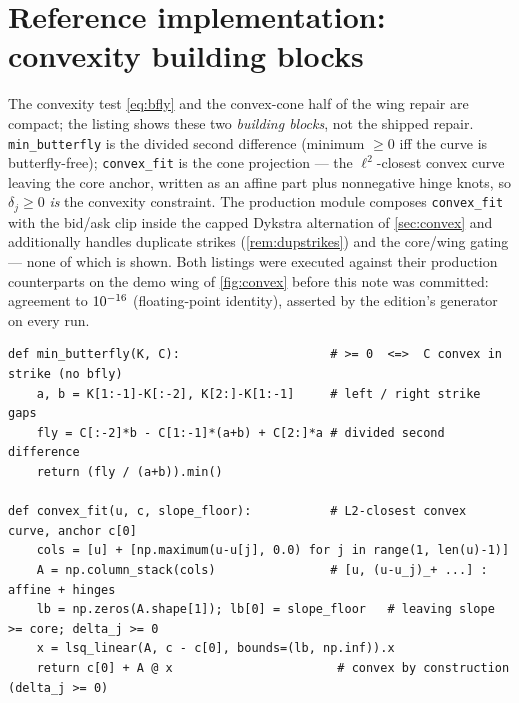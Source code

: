 \documentclass[11pt]{article}
\begin{document}
\section{Reference implementation: convexity building blocks}
\label{app:ref}

The convexity test \eqref{eq:bfly} and the convex-cone half of the wing
repair are compact; the listing shows these two \emph{building blocks},
not the shipped repair.  \texttt{min\_butterfly} is the divided second
difference (minimum $\ge0$ iff the curve is butterfly-free);
\texttt{convex\_fit} is the cone projection --- the $\ell^2$-closest
convex curve leaving the core anchor, written as an affine part plus
nonnegative hinge knots, so $\delta_j\ge0$ \emph{is} the convexity
constraint.  The production module composes \texttt{convex\_fit} with the
bid/ask clip inside the capped Dykstra alternation of \cref{sec:convex}
and additionally handles duplicate strikes (\cref{rem:dupstrikes}) and the
core/wing gating ---
none of which is shown.  Both listings were executed against their
production counterparts on the demo wing of \cref{fig:convex} before this
note was committed: agreement to $10^{-16}$ (floating-point
identity), asserted by the edition's generator on every run.

\begin{lstlisting}[caption={The no-butterfly test and the convex wing fit
(distilled from \texttt{calib/convex\_deam.py}).}]
def min_butterfly(K, C):                     # >= 0  <=>  C convex in strike (no bfly)
    a, b = K[1:-1]-K[:-2], K[2:]-K[1:-1]     # left / right strike gaps
    fly = C[:-2]*b - C[1:-1]*(a+b) + C[2:]*a # divided second difference
    return (fly / (a+b)).min()

def convex_fit(u, c, slope_floor):           # L2-closest convex curve, anchor c[0]
    cols = [u] + [np.maximum(u-u[j], 0.0) for j in range(1, len(u)-1)]
    A = np.column_stack(cols)                # [u, (u-u_j)_+ ...] : affine + hinges
    lb = np.zeros(A.shape[1]); lb[0] = slope_floor   # leaving slope >= core; delta_j >= 0
    x = lsq_linear(A, c - c[0], bounds=(lb, np.inf)).x
    return c[0] + A @ x                       # convex by construction (delta_j >= 0)
\end{lstlisting}
\end{document}
